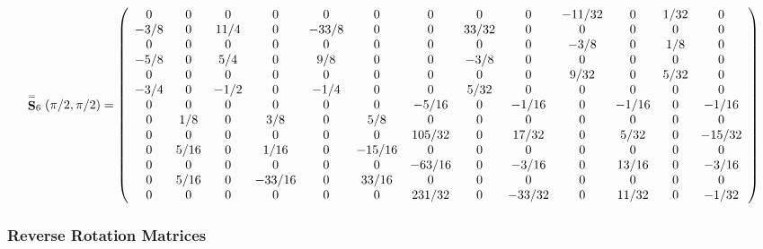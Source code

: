 {\scriptsize
\begin{equation} \label{eq:S6}
\V{S}_6(\pi/2,\pi/2) = \left(
\begin{array}{ccccccccccccc}
   0 &    0 &    0 &      0 &     0 &      0 &      0 &     0 &      0 & -11/32 &     0 & %
1/32 &      0 \\
-3/8 &    0 & 11/4 &      0 & -33/8 &      0 &      0 & 33/32 &      0 &      0 &     0 &    %
0 &      0 \\
   0 &    0 &    0 &      0 &     0 &      0 &      0 &     0 &      0 &   -3/8 &     0 &  %
1/8 &      0 \\
-5/8 &    0 &  5/4 &      0 &   9/8 &      0 &      0 &  -3/8 &      0 &      0 &     0 &    %
0 &      0 \\
   0 &    0 &    0 &      0 &     0 &      0 &      0 &     0 &      0 &   9/32 &     0 & %
5/32 &      0 \\
-3/4 &    0 & -1/2 &      0 &  -1/4 &      0 &      0 &  5/32 &      0 &      0 &     0 &    %
0 &      0 \\
   0 &    0 &    0 &      0 &     0 &      0 &  -5/16 &     0 &  -1/16 &      0 & -1/16 &    %
0 &  -1/16 \\
   0 &  1/8 &    0 &    3/8 &     0 &    5/8 &      0 &     0 &      0 &      0 &     0 &    %
0 &      0 \\
   0 &    0 &    0 &      0 &     0 &      0 & 105/32 &     0 &  17/32 &      0 &  5/32 &    %
0 & -15/32 \\
   0 & 5/16 &    0 &   1/16 &     0 & -15/16 &      0 &     0 &      0 &      0 &     0 &    %
0 &      0 \\
   0 &    0 &    0 &      0 &     0 &      0 & -63/16 &     0 &  -3/16 &      0 & 13/16 &    %
0 &  -3/16 \\
   0 & 5/16 &    0 & -33/16 &     0 &  33/16 &      0 &     0 &      0 &      0 &     0 &    %
0 &      0 \\
   0 &    0 &    0 &      0 &     0 &      0 & 231/32 &     0 & -33/32 &      0 & 11/32 &    %
0 &  -1/32 \\
\end{array} \right)
\end{equation}
}


\subsubsection{Reverse Rotation Matrices} \label{ap-mcph2cfMat}

